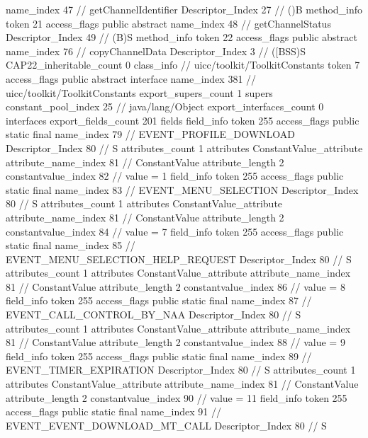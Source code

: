{{{{{					name_index	47		// getChannelIdentifier
					Descriptor_Index	27		// ()B
				}
				method_info {
					token	21
					access_flags	public abstract
					name_index	48		// getChannelStatus
					Descriptor_Index	49		// (B)S
				}
				method_info {
					token	22
					access_flags	public abstract
					name_index	76		// copyChannelData
					Descriptor_Index	3		// ([BSS)S
				}
			}
			CAP22_inheritable_count	0
		}
		class_info {		// uicc/toolkit/ToolkitConstants
			token	7
			access_flags	public abstract interface
			name_index	381		// uicc/toolkit/ToolkitConstants
			export_supers_count	1
			supers {
				constant_pool_index	25		// java/lang/Object
			}
			export_interfaces_count	0
			interfaces {
			}
			export_fields_count	201
			fields {
			field_info {
				token	255
				access_flags	public static final
				name_index	79		// EVENT_PROFILE_DOWNLOAD
				Descriptor_Index	80		// S
				attributes_count	1
				attributes {
				ConstantValue_attribute {
					attribute_name_index	81		// ConstantValue
					attribute_length	2
					constantvalue_index	82		// value = 1
				}
				}
			}
			field_info {
				token	255
				access_flags	public static final
				name_index	83		// EVENT_MENU_SELECTION
				Descriptor_Index	80		// S
				attributes_count	1
				attributes {
				ConstantValue_attribute {
					attribute_name_index	81		// ConstantValue
					attribute_length	2
					constantvalue_index	84		// value = 7
				}
				}
			}
			field_info {
				token	255
				access_flags	public static final
				name_index	85		// EVENT_MENU_SELECTION_HELP_REQUEST
				Descriptor_Index	80		// S
				attributes_count	1
				attributes {
				ConstantValue_attribute {
					attribute_name_index	81		// ConstantValue
					attribute_length	2
					constantvalue_index	86		// value = 8
				}
				}
			}
			field_info {
				token	255
				access_flags	public static final
				name_index	87		// EVENT_CALL_CONTROL_BY_NAA
				Descriptor_Index	80		// S
				attributes_count	1
				attributes {
				ConstantValue_attribute {
					attribute_name_index	81		// ConstantValue
					attribute_length	2
					constantvalue_index	88		// value = 9
				}
				}
			}
			field_info {
				token	255
				access_flags	public static final
				name_index	89		// EVENT_TIMER_EXPIRATION
				Descriptor_Index	80		// S
				attributes_count	1
				attributes {
				ConstantValue_attribute {
					attribute_name_index	81		// ConstantValue
					attribute_length	2
					constantvalue_index	90		// value = 11
				}
				}
			}
			field_info {
				token	255
				access_flags	public static final
				name_index	91		// EVENT_EVENT_DOWNLOAD_MT_CALL
				Descriptor_Index	80		// S
}}}}}
